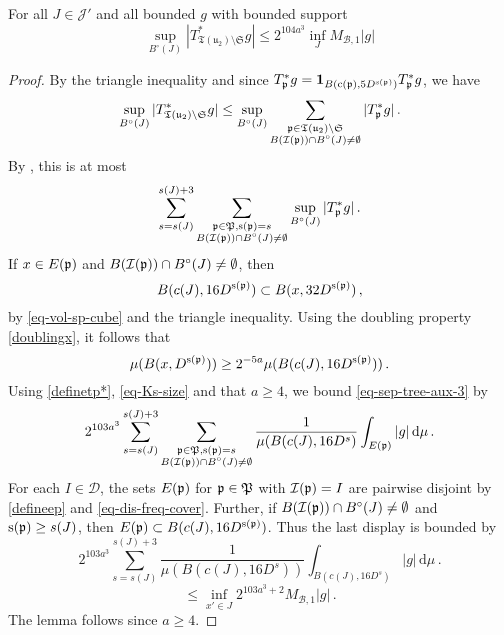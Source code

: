     \begin{lemma}
        \label{local-tree-control}
        \leanok
        For all $J \in \mathcal{J}'$ and all bounded $g$ with bounded support
        $$
            \sup_{B^\circ{}(J)} |T_{\mathfrak{T}(\mathfrak{u}_2)\setminus\mathfrak{S}}^* g| \le 2^{104a^3} \inf_J M_{\mathcal{B},1}|g|
        $$
    \end{lemma}

    \begin{proof}
        \leanok
        By the triangle inequality and since $T_{{\mathfrak p}}^* g = \mathbf{1}_{B({\mathrm{c}}({\mathfrak p}), 5D^{{\mathrm{s}}({\mathfrak p})})} T_{{\mathfrak p}}^* g$, we have
        $$
            \sup_{B^\circ{}(J)} |T_{{\mathfrak T}({\mathfrak u}_2) \setminus\mathfrak{S}}^* g|
            \leq \sup_{B^\circ{}(J)} \sum_{\substack{{\mathfrak p} \in {\mathfrak T}({\mathfrak u}_2) \setminus \mathfrak{S}\\ B({\mathcal{I}}({\mathfrak p})) \cap B^\circ(J) \ne \emptyset}} |T_{{\mathfrak p}}^*g|\,.
        $$
        By , this is at most
      \begin{equation}
            \label{eq-sep-tree-aux-3}
            \sum_{s = s(J)}^{s(J) + 3} \sum_{\substack{{\mathfrak p} \in {\mathfrak P}, {\mathrm{s}}({\mathfrak p}) = s\\ B({\mathcal{I}}({\mathfrak p})) \cap B^\circ(J) \ne \emptyset}} \sup_{B^\circ{}(J)} |T_{{\mathfrak p}}^* g|\,.
        \end{equation}
        If $x \in E({\mathfrak p})$ and $B({\mathcal{I}}({\mathfrak p})) \cap B^\circ(J) \ne \emptyset$, then
        $$
            B(c(J), 16D^{{\mathrm{s}}({\mathfrak p})}) \subset B(x, 32 D^{{\mathrm{s}}({\mathfrak p})})\,,
        $$
        by \eqref{eq-vol-sp-cube} and the triangle inequality. Using the doubling property \eqref{doublingx}, it follows that
        $$
            \mu(B(x, D^{{\mathrm{s}}({\mathfrak p})})) \ge 2^{-5a} \mu(B(c(J), 16D^{{\mathrm{s}}({\mathfrak p})}))\,.
        $$
        Using \eqref{definetp*}, \eqref{eq-Ks-size} and that $a \ge 4$, we bound \eqref{eq-sep-tree-aux-3} by
        $$
            2^{103a^3}\sum_{s = s(J)}^{s(J) + 3} \sum_{\substack{{\mathfrak p} \in {\mathfrak P}, {\mathrm{s}}({\mathfrak p}) = s\\B({\mathcal{I}}({\mathfrak p})) \cap B^\circ(J) \ne \emptyset}} \frac{1}{\mu(B(c(J), 16 D^s)} \int_{E({\mathfrak p})} |g| \, \mathrm{d}\mu\,.
        $$
        For each $I \in \mathcal{D}$, the sets $E({\mathfrak p})$ for ${\mathfrak p} \in {\mathfrak P}$ with ${\mathcal{I}}({\mathfrak p}) = I$ are pairwise disjoint by \eqref{defineep} and \eqref{eq-dis-freq-cover}.
        Further, if $B({\mathcal{I}}({\mathfrak p})) \cap B^\circ(J) \ne \emptyset$ and ${\mathrm{s}}({\mathfrak p}) \ge s(J)$, then $E({\mathfrak p}) \subset B(c(J), 16 D^{{\mathrm{s}}({\mathfrak p})})$. Thus the last display is bounded by
        $$
            2^{103a^3}\sum_{s = s(J)}^{s(J) + 3} \frac{1}{\mu(B(c(J), 16 D^s))} \int_{B(c(J), 16 D^s)} |g| \, \mathrm{d}\mu\,.
        $$
        $$
            \le \inf_{x' \in J} 2^{103a^3 +2} M_{\mathcal{B}, 1} |g|\,.
        $$
        The lemma follows since $a \ge 4$.
    \end{proof}


